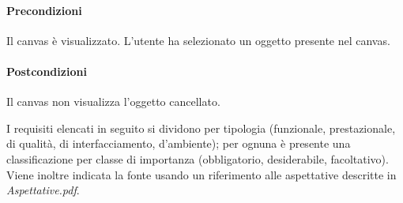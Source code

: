 \paragraph{Precondizioni} Il canvas \`e visualizzato. L'utente ha selezionato un oggetto presente nel canvas.
\paragraph{Postcondizioni} Il canvas non visualizza l'oggetto cancellato.


\label{listarequisiti}
I requisiti elencati in seguito si dividono per tipologia (funzionale, prestazionale, di qualit\`a, di interfacciamento, d'ambiente); 
per ognuna \`e presente una classificazione per classe di importanza (obbligatorio, desiderabile, facoltativo). Viene inoltre indicata la fonte usando un riferimento alle aspettative descritte in \textit{Aspettative.pdf}.
